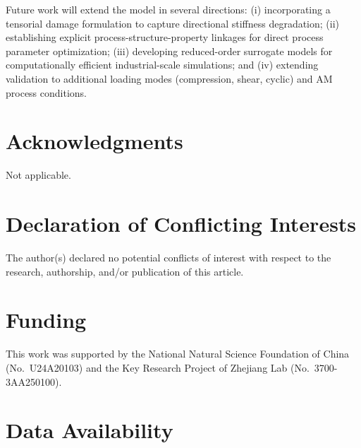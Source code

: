 \documentclass[12pt,a4paper,twocolumn]{article}
\begin{document}
Future work will extend the model in several directions: (i) incorporating a tensorial damage formulation to capture directional stiffness degradation; (ii) establishing explicit process-structure-property linkages for direct process parameter optimization; (iii) developing reduced-order surrogate models for computationally efficient industrial-scale simulations; and (iv) extending validation to additional loading modes (compression, shear, cyclic) and AM process conditions.

\section*{Acknowledgments}

Not applicable.

\section*{Declaration of Conflicting Interests}

The author(s) declared no potential conflicts of interest with respect to the research, authorship, and/or publication of this article.

\section*{Funding}

This work was supported by the National Natural Science Foundation of China (No.~U24A20103) and the Key Research Project of Zhejiang Lab (No.~3700-3AA250100).

\section*{Data Availability}
\end{document}
